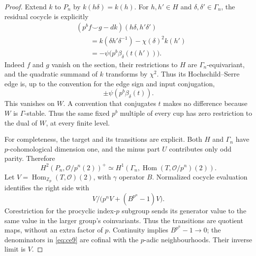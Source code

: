 \documentclass[11pt]{article}
\theoremstyle{definition}
\numberwithin{equation}{section}
\begin{document}
\begin{proof}
Extend $k$ to $P_n$ by $k(h\delta)=k(h)$. For $h,h'\in H$
and $\delta,\delta'\in\Gamma_n$, the residual cocycle is explicitly
\begin{equation}
 \begin{aligned}
 &(p^b f\smile g-dk)(h\delta,h'\delta')\\
 &\qquad=k(\delta h'\delta^{-1})-\chi(\delta)^2k(h')\\
 &\qquad=-\psi\bigl(p^b\beta_\delta(t(h'))\bigr).
 \end{aligned}
\end{equation}
Indeed $f$ and $g$ vanish on the section, their restrictions to $H$
are $\Gamma_n$-equivariant, and the quadratic summand of $k$
transforms by $\chi^2$. Thus its Hochschild--Serre edge is, up to
the convention for the edge sign and input conjugation,
\begin{equation}
 \pm\psi(p^b\beta_\delta(t)).                               \label{eq:ce7}
\end{equation}
This vanishes on $W$. A convention that conjugates $t$ makes no
difference because $W$ is $\Gamma$-stable. Thus the same fixed
$p^b$ multiple of every cup has zero restriction to the dual of
$W$, at every finite level.

For completeness, the target and its transitions are explicit.
Both $H$ and $\Gamma_n$ have $p$-cohomological dimension one,
and the minus part $U$ contributes only odd parity. Therefore
\begin{equation}
 H^2(P_n,\mathcal O/p^n(2))^+
 \simeq H^1(\Gamma_n,\operatorname{Hom}(T,\mathcal O/p^n)(2)).
                                                               \label{eq:ce8}
\end{equation}
Let $V=\operatorname{Hom}_{\mathbb Z_p}(T,\mathcal O)(2)$, with
$\gamma$ operator $B$. Normalized cocycle evaluation identifies
the right side with
\begin{equation}
 V\big/\bigl(p^nV+(B^{p^n}-1)V\bigr).                         \label{eq:ce9}
\end{equation}
Corestriction for the procyclic index-$p$ subgroup sends its
generator value to the same value in the larger group's
coinvariants. Thus the transitions are quotient maps, without an
extra factor of $p$. Continuity implies $B^{p^n}-1\to0$; the
denominators in \eqref{eq:ce9} are cofinal with the $p$-adic neighbourhoods.
Their inverse limit is $V$.


\end{proof}
\end{document}
